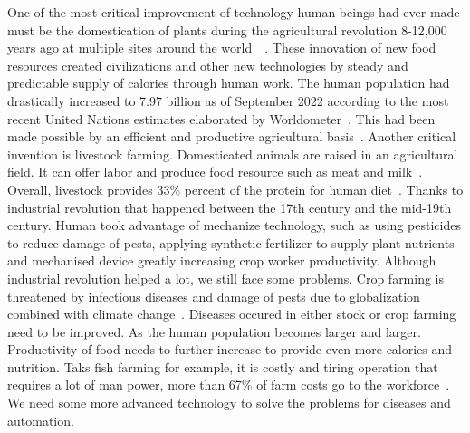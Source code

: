 One of the most critical improvement of technology human beings had ever made must be the domestication of plants during the agricultural revolution 8-12,000 years ago at multiple sites around the world~\cite{agri-wiki}~\cite{agri-history}. These innovation of new food resources created civilizations and other new technologies by steady and predictable supply of calories through human work. The human population had drastically increased to 7.97 billion as of September 2022 according to the most recent United Nations estimates elaborated by Worldometer~\cite{argi-pop}. This had been made possible by an efficient and productive agricultural basis~\cite{agri-pop2}.
Another critical invention is livestock farming. Domesticated animals are raised in an agricultural field. It can offer labor and produce food resource such as meat and milk~\cite{agri-stock}. Overall, livestock provides 33\% percent of the protein for human diet~\cite{agri-stock2}.
Thanks to industrial revolution that happened between the 17th century and the mid-19th century. Human took advantage of mechanize technology, such as using pesticides to reduce damage of pests, applying synthetic fertilizer to supply plant nutrients and mechanised device greatly increasing crop worker productivity. Although industrial revolution helped a lot, we still face some problems. Crop farming is threatened by infectious diseases and damage of pests due to globalization combined with climate change~\cite{crop-fail}. Diseases occured in either stock or crop farming need to be improved. As the human population becomes larger and larger. Productivity of food needs to further increase to provide even more calories and nutrition. Taks fish farming for example, it is costly and tiring operation that requires a lot of man power, more than 67\% of farm costs go to the workforce~\cite{fish-labour}. We need some more advanced technology to solve the problems for diseases and automation.

